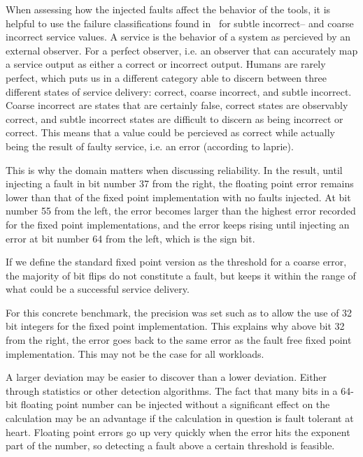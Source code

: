 
When assessing how the injected faults affect the behavior of the tools, it is helpful to use the failure classifications found in~\citet{failure_class_with_respect_to_detection} for subtle incorrect-- and coarse incorrect service values. A service is the behavior of a system as percieved by an external observer. For a perfect observer, i.e. an observer that can accurately map a service output as either a correct or incorrect output. Humans are rarely perfect, which puts us in a different category able to discern between three different states of service delivery: correct, coarse incorrect, and subtle incorrect.  Coarse incorrect are states that are certainly false, correct states are observably correct, and subtle incorrect states are difficult to discern as being incorrect or correct. This means that a value could be percieved as correct while actually being the result of faulty service, i.e. an error (according to laprie).

This is why the domain matters when discussing reliability. In the result, until injecting a fault in bit number 37 from the right, the floating point error remains lower than that of the fixed point implementation with no faults injected. At bit number 55 from the left, the error becomes larger than the highest error recorded for the fixed point implementations, and the error keeps rising until injecting an error at bit number 64 from the left, which is the sign bit.

If we define the standard fixed point version as the threshold for a coarse error, the majority of bit flips do not constitute a fault, but keeps it within the range of what could be a successful service delivery. 


For this concrete benchmark, the precision was set such as to allow the use of 32 bit integers for the fixed point implementation. This explains why above bit 32 from the right, the error goes back to the same error as the fault free fixed point implementation. This may not be the case for all workloads. 



A larger deviation may be easier to discover than a lower deviation. Either through statistics or other detection algorithms. The fact that many bits in a 64-bit floating point number can be injected without a significant effect on the calculation may be an advantage if the calculation in question is fault tolerant at heart. Floating point errors go up very quickly when the error hits the exponent part of the number, so detecting a fault above a certain threshold is feasible.

